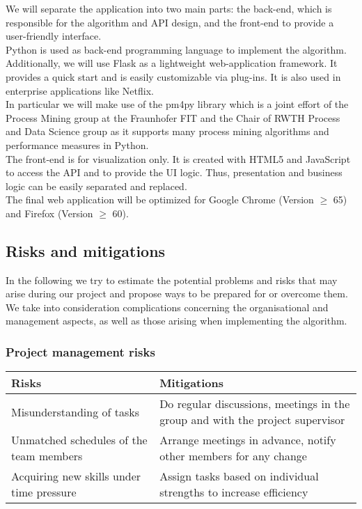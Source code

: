 \documentclass[notitlepage]{article}
\begin{document}
\begin{flushleft}
We will separate the application into two main parts: the back-end, which is responsible for the algorithm and API design, and the front-end to provide a user-friendly interface.\\
\medskip
Python is used as back-end programming language to implement the algorithm. Additionally, we will use Flask as a lightweight web-application framework. 
It provides a quick start and is easily customizable via plug-ins. It is also used in enterprise applications like Netflix.\\
\medskip
In particular we will make use of the pm4py library which is a joint effort of the Process Mining group at the Fraunhofer FIT and the Chair of
RWTH Process and Data Science group as it supports many process mining algorithms and performance measures in Python.\\
\medskip
The front-end is for visualization only. It is created with HTML5 and JavaScript to access the API and to provide the UI logic. 
Thus, presentation and business logic can be easily separated and replaced.\\
\medskip
The final web application will be optimized for Google Chrome (Version $\geq$ 65) and Firefox (Version $\geq$ 60).


\subsection{Risks and mitigations}
In the following we try to estimate the potential problems and risks that may arise during our project and propose ways to be prepared for or overcome them.
We take into consideration complications concerning the organisational and management aspects, as well as those arising when implementing the algorithm.

\subsubsection{Project management risks}

\begin{tabularx}{15cm}{|X|X|}
\hline
\textbf{Risks} &\textbf{Mitigations}\\
\hline
Misunderstanding of tasks & Do regular discussions, meetings in the group and with the project supervisor\\
\hline
Unmatched schedules of the team members & Arrange meetings in advance, notify other members for any change  \\
\hline
Acquiring new skills under time pressure & Assign tasks based on individual strengths to increase efficiency \\ 
\hline
\end{tabularx}\\ 



\end{flushleft}
\end{document}
